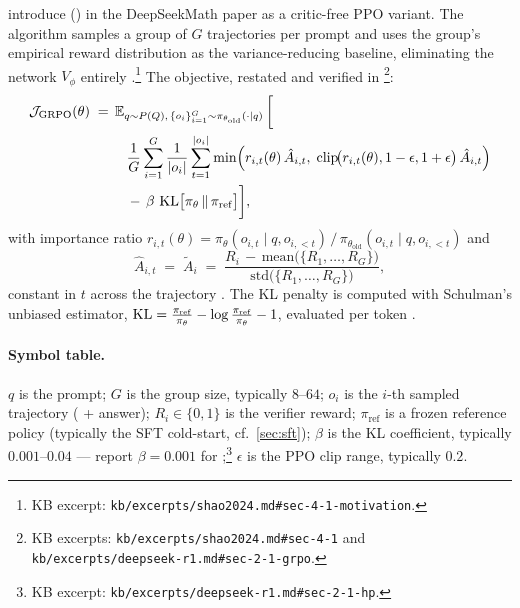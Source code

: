 \citet{shao2024} introduce \emph{}
() in the DeepSeekMath paper as a critic-free PPO variant. The
algorithm samples a group of $G$ trajectories per prompt and uses the
group's empirical reward distribution as the variance-reducing
baseline, eliminating the  network $V_\phi$ entirely
\citep[\S 4.1, motivation]{shao2024}.\footnote{KB excerpt:
\nolinkurl{kb/excerpts/shao2024.md#sec-4-1-motivation}.} The objective,
restated and verified in \citet[\S 2.1, Eq.\ 1]{deepseek-r1}\footnote{KB
excerpts: \nolinkurl{kb/excerpts/shao2024.md#sec-4-1} and
\nolinkurl{kb/excerpts/deepseek-r1.md#sec-2-1-grpo}.}:
\begin{equation}
\begin{aligned}
\mathcal{J}_{\mathrm{GRPO}}(\theta) \;=\; & \operatorname{\mathbb{E}}_{q \sim P(Q),\, \{o_i\}_{i=1}^G \sim \pi_{\theta_{\mathrm{old}}}(\cdot \mid q)} \bigg[ \\
& \quad \frac{1}{G} \sum_{i=1}^{G} \frac{1}{|o_i|} \sum_{t=1}^{|o_i|}
\min\!\Big( r_{i,t}(\theta)\, \hat{A}_{i,t},\;
\mathrm{clip}\!\big(r_{i,t}(\theta), 1 - \epsilon, 1 + \epsilon\big)\, \hat{A}_{i,t} \Big) \\
& \quad -\, \beta \, \operatorname{KL}\!\big[\pi_\theta \,\|\, \pi_{\mathrm{ref}}\big] \bigg],
\end{aligned}
\label{eq:grpo}
\end{equation}
with importance ratio
$r_{i,t}(\theta) = \pi_\theta(o_{i,t} \mid q, o_{i,<t}) \,/\, \pi_{\theta_{\mathrm{old}}}(o_{i,t} \mid q, o_{i,<t})$
and \emph{}
\begin{equation}
\hat{A}_{i,t} \;=\; \tilde{A}_i \;=\; \frac{R_i \,-\, \mathrm{mean}\!\big(\{R_1, \ldots, R_G\}\big)}{\mathrm{std}\!\big(\{R_1, \ldots, R_G\}\big)},
\label{eq:grpo-advantage}
\end{equation}
constant in $t$ across the trajectory \citep[\S 4.1, Eq.\ verified
against R1 \S 2.1 Eq.\ 3]{shao2024}. The KL penalty is computed with
Schulman's unbiased estimator,
$\operatorname{KL} = \tfrac{\pi_{\mathrm{ref}}}{\pi_\theta} - \log\tfrac{\pi_{\mathrm{ref}}}{\pi_\theta} - 1$,
evaluated per token \citep[\S 4.1]{shao2024}.

\paragraph{Symbol table.} $q$ is the prompt; $G$ is the group size,
typically $8$--$64$; $o_i$ is the $i$-th sampled trajectory
( + answer); $R_i \in \{0, 1\}$ is the verifier reward;
$\pi_{\mathrm{ref}}$ is a frozen reference policy (typically the SFT
cold-start, cf.\ \cref{sec:sft}); $\beta$ is the KL coefficient,
typically $0.001$--$0.04$ — \citet[\S 2.1]{deepseek-r1} report
$\beta = 0.001$ for ;\footnote{KB excerpt:
\nolinkurl{kb/excerpts/deepseek-r1.md#sec-2-1-hp}.} $\epsilon$ is the PPO
clip range, typically $0.2$.

